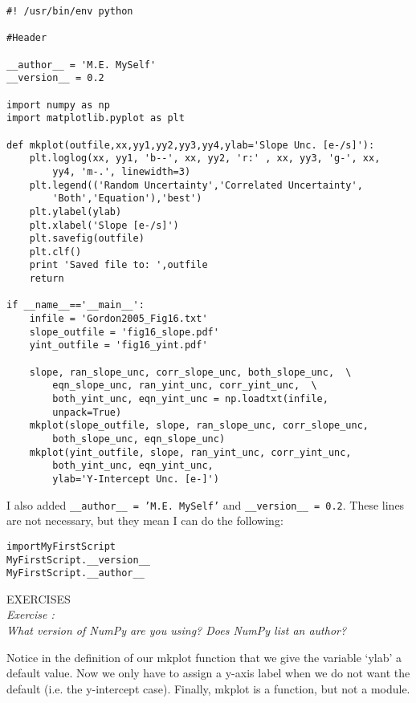 \begin{verbatim}
#! /usr/bin/env python

#Header

__author__ = 'M.E. MySelf'
__version__ = 0.2

import numpy as np
import matplotlib.pyplot as plt

def mkplot(outfile,xx,yy1,yy2,yy3,yy4,ylab='Slope Unc. [e-/s]'):
    plt.loglog(xx, yy1, 'b--', xx, yy2, 'r:' , xx, yy3, 'g-', xx,  
        yy4, 'm-.', linewidth=3) 
    plt.legend(('Random Uncertainty','Correlated Uncertainty',  
        'Both','Equation'),'best')
    plt.ylabel(ylab) 
    plt.xlabel('Slope [e-/s]') 
    plt.savefig(outfile) 
    plt.clf()
    print 'Saved file to: ',outfile 
    return  
    
if __name__=='__main__': 
    infile = 'Gordon2005_Fig16.txt' 
    slope_outfile = 'fig16_slope.pdf'  
    yint_outfile = 'fig16_yint.pdf'  
    
    slope, ran_slope_unc, corr_slope_unc, both_slope_unc,  \
        eqn_slope_unc, ran_yint_unc, corr_yint_unc,  \
        both_yint_unc, eqn_yint_unc = np.loadtxt(infile, 
        unpack=True) 
    mkplot(slope_outfile, slope, ran_slope_unc, corr_slope_unc,  
        both_slope_unc, eqn_slope_unc) 
    mkplot(yint_outfile, slope, ran_yint_unc, corr_yint_unc,  
        both_yint_unc, eqn_yint_unc,
        ylab='Y-Intercept Unc. [e-]')
\end{verbatim}

I also added \texttt{\_\_author\_\_ = 'M.E. MySelf'} and
\texttt{\_\_version\_\_ = 0.2}.  These lines are not necessary, but
they mean I can do the following:
\begin{alltt}
\pytab import MyFirstScript
\pytab MyFirstScript.__version__
\pytab MyFirstScript.__author__
\end{alltt}

{\color{blue} {\sf\small EXERCISES}} \\
{\it Exercise  :  \\
  What version of NumPy are you using?  Does NumPy list an author?
}

Notice in the definition of our mkplot function that we give the
variable `ylab' a default value.  Now we only have to assign a y-axis
label when we do not want the default (i.e. the y-intercept case).
Finally, {\sf \small mkplot} is a function, but not a module.

